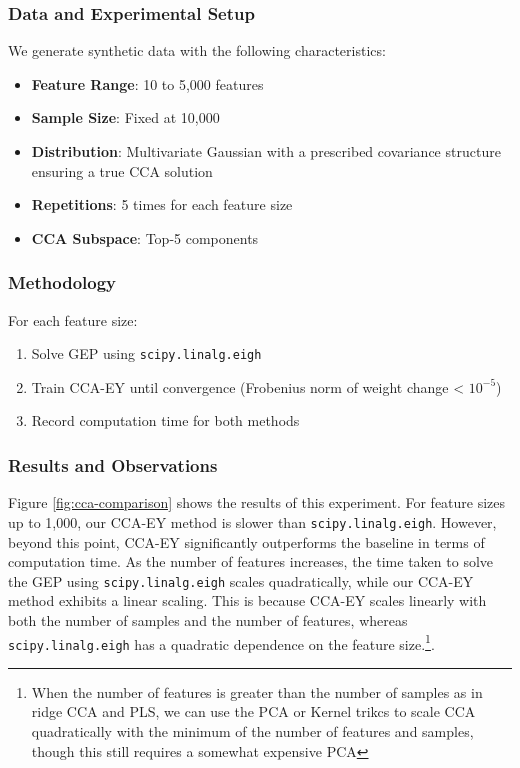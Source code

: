 \subsubsection{Data and Experimental Setup}
We generate synthetic data with the following characteristics:
\begin{itemize}
    \item \textbf{Feature Range}: 10 to 5,000 features
    \item \textbf{Sample Size}: Fixed at 10,000
    \item \textbf{Distribution}: Multivariate Gaussian with a prescribed covariance structure ensuring a true CCA solution
    \item \textbf{Repetitions}: 5 times for each feature size
    \item \textbf{CCA Subspace}: Top-5 components
\end{itemize}

\subsubsection{Methodology}
For each feature size:
\begin{enumerate}
    \item Solve GEP using \texttt{scipy.linalg.eigh}
    \item Train CCA-EY until convergence (Frobenius norm of weight change < $10^{-5}$)
    \item Record computation time for both methods
\end{enumerate}

\subsubsection{Results and Observations}
Figure \ref{fig:cca-comparison} shows the results of this experiment. For feature sizes up to 1,000, our CCA-EY method is slower than \texttt{scipy.linalg.eigh}. However, beyond this point, CCA-EY significantly outperforms the baseline in terms of computation time.
As the number of features increases, the time taken to solve the GEP using \texttt{scipy.linalg.eigh} scales quadratically, while our CCA-EY method exhibits a linear scaling. This is because CCA-EY scales linearly with both the number of samples and the number of features, whereas \texttt{scipy.linalg.eigh} has a quadratic dependence on the feature size.\footnote{When the number of features is greater than the number of samples as in ridge CCA and PLS, we can use the PCA or Kernel trikcs to scale CCA quadratically with the minimum of the number of features and samples, though this still requires a somewhat expensive PCA}.

